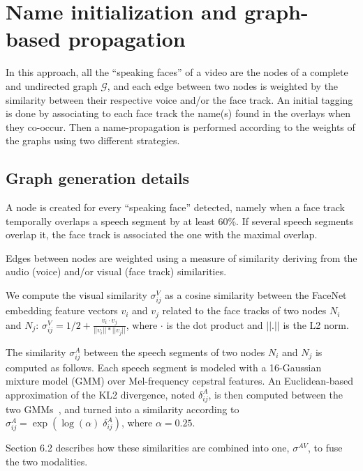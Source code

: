 \section{Name initialization and graph-based propagation}
\label{sec:graph}

In this approach, all the ``speaking faces'' of a video are the nodes of a complete and undirected graph $\mathcal{G}$, and each edge between two nodes is weighted by the similarity between their respective voice and/or the face track.
An initial tagging is done by associating to each face track the name(s) found in the overlays when they co-occur. Then a name-propagation is performed according to the weights of the graphs using two different strategies.

\subsection{Graph generation details}
\label{ssec:graph_gen}
A node is created for every ``speaking face'' detected, namely when a face track temporally overlaps a speech segment by at least 60\%. If several speech segments overlap it, the face track is associated the one with the maximal overlap.

Edges between nodes are weighted using a measure of similarity deriving from the audio (voice) and/or visual (face track) similarities.

We compute the visual similarity $\sigma^V_{ij}$ as a cosine similarity between the FaceNet embedding feature vectors $v_i$ and $v_j$ related to the face tracks of two nodes $N_i$ and $N_j$: $\sigma^V_{ij}=1/2+\frac{v_i\cdot v_j}{||v_i||*||v_j||}$, where $\cdot$ is the dot product and $||.||$ is the L2 norm.

The similarity $\sigma^A_{ij}$ between the speech segments of two nodes  $N_i$ and $N_j$ is computed as follows. Each speech segment is modeled with a 16-Gaussian mixture model (GMM) over Mel-frequency cepstral features. An Euclidean-based approximation of the KL2 divergence, noted $\delta^A_{ij}$, is then computed between the two GMMs~\cite{Ben}, and turned into a similarity according to $\sigma^A_{ij}=\exp(\log{(\alpha)} \; \delta^A_{ij})$, where $\alpha = 0.25$.

Section 6.2 describes how these similarities are combined into one, $\sigma^{AV}$, to fuse the two modalities.

